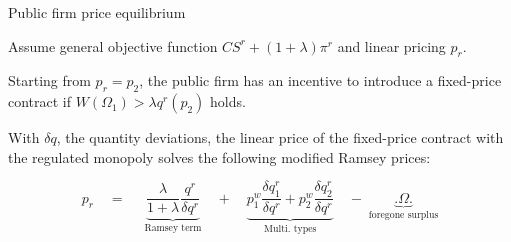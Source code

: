 \documentclass{class}
\begin{document}
\begin{frame}{Public firm price equilibrium}\label{RamseyOutside}

Assume general objective function $CS^r + (1+\lambda) \pi^r$ and linear pricing $p_r$.

\vfill

\begin{proposition}

Starting from $p_r = p_2$, the public firm has an incentive to introduce a fixed-price contract if $ W(\Omega_1) > \lambda q^r(p_2)$ holds.


\end{proposition}


\vfill

\begin{proposition}
 
With $\delta q$, the quantity deviations, the linear price of the fixed-price contract with the regulated monopoly solves the following modified Ramsey prices:
 

\begin{equation*}
      p_r \quad = \quad \;\underbrace{ \frac{\lambda}{1+\lambda} \frac{q^r}{\delta q^r}}_{\text{Ramsey term}} \quad + \quad \underbrace{p^w_1\frac{\delta q^r_1}{\delta q^r}+p^w_2\frac{\delta q^r_2}{\delta q^r}}_{\text{Multi. types}} \quad -  \;   \underbrace{\bigg. \Omega \bigg.}_{\text{foregone surplus}}  
\end{equation*}

\end{proposition}


\end{frame}



\end{document}
